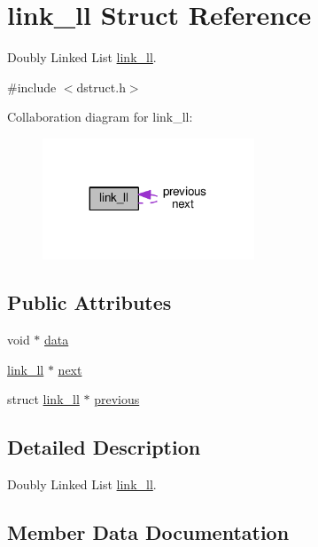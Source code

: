\hypertarget{structlink__ll}{}\section{link\+\_\+ll Struct Reference}
\label{structlink__ll}


Doubly Linked List \hyperlink{structlink__ll}{link\+\_\+ll}.  




{\ttfamily \#include $<$dstruct.\+h$>$}



Collaboration diagram for link\+\_\+ll\+:\nopagebreak
\begin{figure}[H]
\begin{center}
\leavevmode
\includegraphics[width=179pt]{structlink__ll__coll__graph}
\end{center}
\end{figure}
\subsection*{Public Attributes}
\begin{DoxyCompactItemize}
\item 
void $\ast$ \hyperlink{structlink__ll_ae86aee74bb21358f58a36f9d75b04ecb}{data}
\item 
\hyperlink{structlink__ll}{link\+\_\+ll} $\ast$ \hyperlink{structlink__ll_a017a3db913bb97caa35e7c4b2be88651}{next}
\item 
struct \hyperlink{structlink__ll}{link\+\_\+ll} $\ast$ \hyperlink{structlink__ll_a48b96c80d57fcaf97793ae54d02daa49}{previous}
\end{DoxyCompactItemize}


\subsection{Detailed Description}
Doubly Linked List \hyperlink{structlink__ll}{link\+\_\+ll}. 

\subsection{Member Data Documentation}
